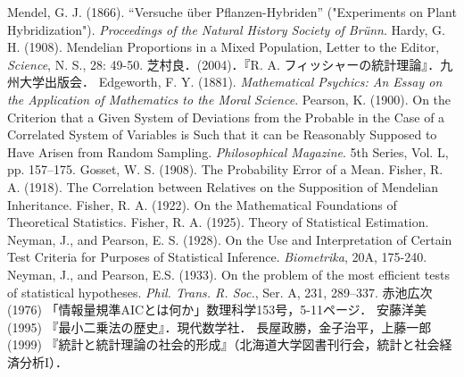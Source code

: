 \documentclass[uplatex,dvipdfmx]{jsreport}
\begin{document}
\begin{thebibliography}{99}
    Mendel, G. J. (1866). “Versuche über Pflanzen-Hybriden” ("Experiments on Plant Hybridization"). \textit{Proceedings of the Natural History Society of Brünn}.
    Hardy, G. H. (1908). Mendelian Proportions in a Mixed Population, Letter to the Editor, \textit{Science}, N. S., 28: 49-50.
    芝村良．(2004)．『R. A. フィッシャーの統計理論』．九州大学出版会．
    Edgeworth, F. Y. (1881). \textit{Mathematical Psychics: An Essay on the Application of Mathematics to the Moral Science}.
    Pearson, K. (1900). On the Criterion that a Given System of Deviations from the Probable in the Case of a Correlated System of Variables is Such that it can be Reasonably Supposed to Have Arisen from Random Sampling. \textit{Philosophical Magazine}. 5th Series, Vol. L, pp. 157–175.
    Gosset, W. S. (1908). The Probability Error of a Mean.
    Fisher, R. A. (1918). The Correlation between Relatives on the Supposition of Mendelian Inheritance.
    Fisher, R. A. (1922). On the Mathematical Foundations of Theoretical Statistics.
    Fisher, R. A. (1925). Theory of Statistical Estimation.
    Neyman, J., and Pearson, E. S. (1928). On the Use and Interpretation of Certain Test Criteria for Purposes of Statistical Inference. \textit{Biometrika}, 20A, 175-240.
    Neyman, J., and Pearson, E.S. (1933). On the problem of the most efficient tests of statistical hypotheses. \textit{Phil. Trans. R. Soc.}, Ser. A, 231, 289–337.
    赤池広次 (1976) 「情報量規準AICとは何か」数理科学153号，5-11ページ．
    安藤洋美 (1995) 『最小二乗法の歴史』．現代数学社．
    長屋政勝，金子治平，上藤一郎 (1999) 『統計と統計理論の社会的形成』（北海道大学図書刊行会，統計と社会経済分析I）．
\end{thebibliography}
\end{document}
